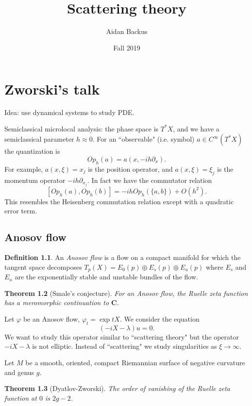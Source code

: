 \documentclass[12pt]{report}
\title{Scattering theory}
\author{Aidan Backus}
\date{Fall 2019}
\newcommand{\CC}{\mathbf{C}}
\newcommand{\dfn}[1]{\emph{#1}\index{#1}}
\newtheorem{theorem}{Theorem}[chapter]
\theoremstyle{definition}
\newtheorem{definition}[theorem]{Definition}
\theoremstyle{remark}
\begin{document}
\maketitle

\tableofcontents

\newpage

\chapter{Zworski's talk}
Idea: use dynamical systems to study PDE.

Semiclassical microlocal analysis: the phase space is $T^*X$, and we have a semiclassical parameter $h \approx 0$. For an ``observable" (i.e. symbol) $a \in C^\infty(T^*X)$ the quantization is
$$Op_h(a) = a(x, -ih \partial_x).$$
For example, $a(x, \xi) = x_j$ is the position operator, and $a(x, \xi) = \xi_j$ is the momentum operator $-ih\partial_{x_j}$. In fact we have the commutator relation
$$[Op_h(a), Op_h(b)] = -ihOp_h(\{a, b\}) + O(h^2).$$
This resembles the Heisenberg commutation relation except with a quadratic error term.

\section{Anosov flow}
\begin{definition}
	An \dfn{Anosov flow} is a flow on a compact manifold for which the tangent space decomposes $T_p(X) = E_0(p) \oplus E_s(p) \oplus E_u(p)$
	where $E_s$ and $E_u$ are the exponentially stable and unstable bundles of the flow.
\end{definition}
\begin{theorem}[Smale's conjecture]
	For an Anosov flow, the Ruelle zeta function has a meromorphic continuation to $\CC$.
\end{theorem}
Let $\varphi$ be an Anosov flow, $\varphi_t = \exp tX$. We consider the equation
$$(-iX - \lambda)u = 0.$$
We want to study this operator similar to ``scattering theory" but the operator $-iX - \lambda$ is not elliptic. Instead of ``scattering" we study singularities as $\xi \to \infty$. 

Let $M$ be a smooth, oriented, compact Riemannian surface of negative curvature and genus $g$.
\begin{theorem}[Dyatlov-Zworski]
	The order of vanishing of the Ruelle zeta function at $0$ is $2g - 2$.
\end{theorem}


\printindex
\end{document}
